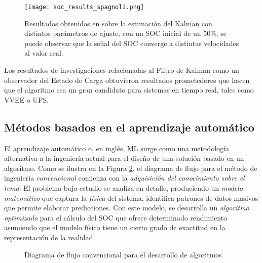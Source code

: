 \begin{figure}[h!]
    \begin{center}
        \texttt{[image: soc\_results\_spagnoli.png]}
        \caption{Resultados obtenidos en \cite{spagnol_kalman} sobre la
        estimaci\'on del Kalman con distintos par\'ametros de ajuste, con un
        \acrshort{SOC} inicial de un 50\%, se puede observar que la señal del
        \acrshort{SOC} converge a distintas velocidades al valor real.}
        \label{resultados_soc_spagnoli}
    \end{center}
\end{figure}

\noindent Los resultados de investigaciones relacionadas al Filtro de Kalman
como un observador del Estado de Carga obtuvieron resultados prometedores que
hacen que el algoritmo sea un gran candidato para sistemas en tiempo real, tales
como \acrshort{VVEE} o \acrshort{UPS}.

\subsection{M\'etodos basados en el aprendizaje autom\'atico}

\noindent El aprendizaje autom\'atico o, en ingl\'es, \acrfull{ML} surge como
una metodolog\'ia alternativa a la ingenier\'ia actual para el diseño de una
soluci\'on basado en un algoritmo. Como se ilustra en la Figura
\ref{curr_eng_approach}, el diagrama de flujo para el m\'etodo de ingenier\'ia
\emph{convencional} comienza con la \emph{adquisici\'on del conocimiento sobre
el tema}: El problema bajo estudio se analiza en detalle, produciendo un
\emph{modelo matem\'atico} que captura la \emph{f\'isica} del sistema,
identifica patrones de datos masivos que permite elaborar predicciones. Con 
este modelo, se desarrolla un \emph{algoritmo optimizado} para el cálculo del 
\acrshort{SOC} que ofrece determinado rendimiento asumiendo que el modelo 
f\'isico tiene un cierto grado de exactitud en la representaci\'on de la 
realidad.

\begin{figure}[h!]
    \begin{center}
    \end{center}
    \caption{Diagrama de flujo convencional para el desarrollo de algoritmos}
    \label{curr_eng_approach}
\end{figure}

